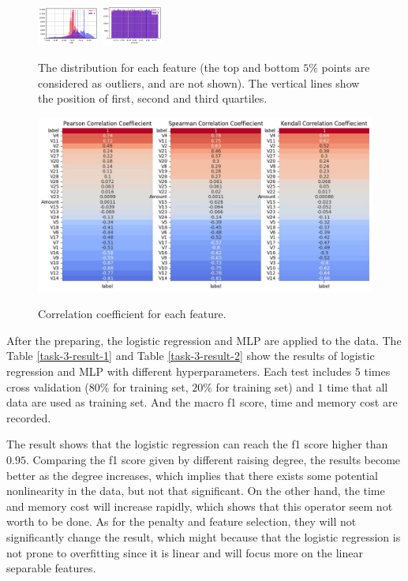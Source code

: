 \documentclass[11pt]{article}
\begin{document}
\begin{figure}[H]
  \includegraphics[width=0.18\textwidth]{../code/Task3/Analysis/Hist-V28.jpg}
  \includegraphics[width=0.18\textwidth]{../code/Task3/Analysis/Hist-Amount.jpg}
  \caption{The distribution for each feature (the top and bottom $5\%$ points are considered as outliers, and are not shown). The vertical lines show the position of first, second and third quartiles.}
  \label{task-3-data-distribution-feature}
\end{figure}

\begin{figure}[H]
  \centering
  \includegraphics[width=\textwidth]{../code/Task3/Analysis/corrcoef.jpg} \\
  \caption{Correlation coefficient for each feature.}
  \label{task-3-correlation-coefficient}
\end{figure}

After the preparing, the logistic regression and MLP are applied to the data. The Table \ref{task-3-result-1} and Table \ref{task-3-result-2} show the results of logistic regression and MLP with different hyperparameters. Each test includes $5$ times cross validation ($80\%$ for training set, $20\%$ for training set) and $1$ time that all data are used as training set. And the macro f1 score, time and memory cost are recorded.

The result shows that the logistic regression can reach the f1 score higher than $0.95$. Comparing the f1 score given by different raising degree, the results become better as the degree increases, which implies that there exists some potential nonlinearity in the data, but not that significant. On the other hand, the time and memory cost will increase rapidly, which shows that this operator seem not worth to be done. As for the penalty and feature selection, they will not significantly change the result, which might because that the logistic regression is not prone to overfitting since it is linear and will focus more on the linear separable features.
\end{document}
